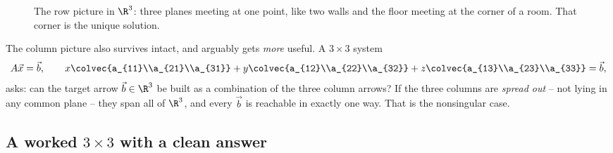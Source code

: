 \begin{figure}[H]
\centering
{}
\caption{The row picture in $\R^3$: three planes meeting at one point, like
two walls and the floor meeting at the corner of a room. That corner is the
unique solution.}
\label{ch06:corner}
\end{figure}

The column picture also survives intact, and arguably gets \emph{more}
useful. A $3\times3$ system
\[
  A\vec x=\vec b,\qquad
  x\colvec{a_{11}\\a_{21}\\a_{31}} + y\colvec{a_{12}\\a_{22}\\a_{32}}
  + z\colvec{a_{13}\\a_{23}\\a_{33}} = \vec b,
\]
asks: can the target arrow $\vec b\in\R^3$ be built as a combination of the
three column arrows? If the three columns are \emph{spread out} -- not lying
in any common plane -- they span all of $\R^3$, and every $\vec b$ is
reachable in exactly one way. That is the nonsingular case.

\subsection{A worked $3\times3$ with a clean answer}


